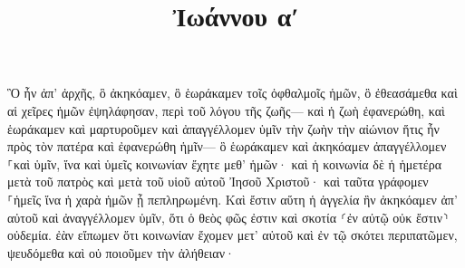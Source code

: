 \documentclass{openreader}
\title{Ἰωάννου αʹ}
\date{}
\begin{document}
\maketitle
\raggedbottom 
\fontsize{16pt}{24pt}\selectfont


Ὃ ἦν ἀπ’ ἀρχῆς, ὃ ἀκηκόαμεν, ὃ ἑωράκαμεν τοῖς ὀφθαλμοῖς ἡμῶν, ὃ ἐθεασάμεθα καὶ αἱ χεῖρες ἡμῶν ἐψηλάφησαν, περὶ τοῦ λόγου τῆς ζωῆς— 
καὶ ἡ ζωὴ ἐφανερώθη, καὶ ἑωράκαμεν καὶ μαρτυροῦμεν καὶ ἀπαγγέλλομεν ὑμῖν τὴν ζωὴν τὴν αἰώνιον ἥτις ἦν πρὸς τὸν πατέρα καὶ ἐφανερώθη ἡμῖν— 
ὃ ἑωράκαμεν καὶ ἀκηκόαμεν ἀπαγγέλλομεν ⸀καὶ ὑμῖν, ἵνα καὶ ὑμεῖς κοινωνίαν ἔχητε μεθ’ ἡμῶν· καὶ ἡ κοινωνία δὲ ἡ ἡμετέρα μετὰ τοῦ πατρὸς καὶ μετὰ τοῦ υἱοῦ αὐτοῦ Ἰησοῦ Χριστοῦ· 
καὶ ταῦτα γράφομεν ⸀ἡμεῖς ἵνα ἡ χαρὰ ἡμῶν ᾖ πεπληρωμένη. 
Καὶ ἔστιν αὕτη ἡ ἀγγελία ἣν ἀκηκόαμεν ἀπ’ αὐτοῦ καὶ ἀναγγέλλομεν ὑμῖν, ὅτι ὁ θεὸς φῶς ἐστιν καὶ σκοτία ⸂ἐν αὐτῷ οὐκ ἔστιν⸃ οὐδεμία. 
ἐὰν εἴπωμεν ὅτι κοινωνίαν ἔχομεν μετ’ αὐτοῦ καὶ ἐν τῷ σκότει περιπατῶμεν, ψευδόμεθα καὶ οὐ ποιοῦμεν τὴν ἀλήθειαν· 
\end{document}
